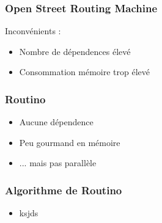 \begin{frame}
\frametitle{Open Street Routing Machine}
Inconvénients :
\begin{itemize}
\item Nombre de dépendences élevé
\item Consommation mémoire trop élevé
\end{itemize}
\end{frame}


\begin{frame}
\frametitle{Routino}
\begin{itemize}
\item Aucune dépendence
\item Peu gourmand en mémoire
\item ... mais pas parallèle
\end{itemize}
\end{frame}



\begin{frame}
\frametitle{Algorithme de Routino}
\begin{itemize}
  \item ksjds
\end{itemize}
\end{frame}
